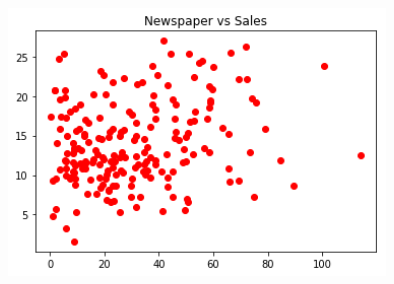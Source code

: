 \begin{center}
 \includegraphics[width=10cm,keepaspectratio=true]{./images/newsVsSales.png}
\end{center}

